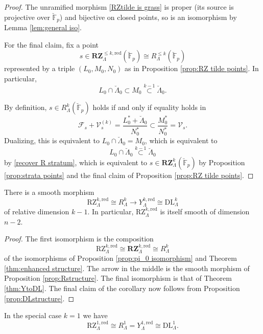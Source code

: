 \documentclass[11pt]{alggeom}
\newcommand{\iso}{\cong}
\newcommand{\red}{\mathrm{red}}
\newcommand{\F}{\mathbb F}
\begin{document}
\begin{proof}
The  unramified morphism \eqref{RZtilde is grass} is proper (its source  is projective over $\breve{\F}_p$) and bijective on closed points, so  is an isomorphism by Lemma \ref{lem:general iso}. 

For the final claim, fix a point 
\[
s\in \mathbf{RZ}_\Lambda^{\le k,\red}(\breve{\F}_p) \iso R_\Lambda^{\le k}(\breve{\F}_p)
\]
 represented by a triple $(L_0,M_0,N_0)$ as in Proposition \ref{prop:RZ tilde points}.  
 In particular,
 \begin{equation}\label{recover R stratum}
 L_0 \cap \breve{\Lambda}_0  \subset  M_0 \stackrel{k-1}{\subset} \breve{\Lambda}_0.
 \end{equation}
 
By definition,  $s \in R_\Lambda^k(\breve{\F}_p)$ holds if and only if equality holds in
\[
 \mathscr{F}_s + \mathscr{V}_s^{(k)} = \frac{L_0^*+ \breve{\Lambda}_0}{N_0^*} \subset \frac{M_0^*}{N_0^*} = \mathscr{V}_s.
\]
 Dualizing, this is equivalent to $L_0 \cap \breve{\Lambda}_0 = M_0$, which is equivalent to  
\[
L_0 \cap \breve{\Lambda}_0   \stackrel{k-1}{\subset} \breve{\Lambda}_0
\]
by \eqref{recover R stratum}, which is equivalent to  $s \in \mathbf{RZ}_\Lambda^k(\breve{\F}_p)$ by 
Proposition \ref{prop:strata points} and the final claim of Proposition \ref{prop:RZ tilde points}.
\end{proof}


\begin{corollary}\label{cor:grassmannian}
There is a  smooth morphism
\[
\mathrm{RZ}_\Lambda^{k,\red} \iso R^k_\Lambda  \to Y_\Lambda^{k,\red}\iso \mathrm{DL}_\Lambda^k
\]
of relative dimension $k-1$.  In particular, $\mathrm{RZ}_\Lambda^{k,\red}$ is itself smooth of dimension $n-2$.
\end{corollary}

\begin{proof}
The first isomorphism is the composition
\[
\mathrm{RZ}_\Lambda^{k,\red} \iso \mathbf{RZ}_\Lambda^{k,\red} \iso R^k_\Lambda
\]
of the isomorphisms of Proposition \ref{prop:pi_0 isomorphism} and Theorem \ref{thm:enhanced structure}.  The arrow in the middle is the smooth morphism of Proposition \ref{prop:Rstructure}.  The final isomorphism is that of Theorem \ref{thm:YtoDL}.  The final claim of the corollary now follows from Proposition \ref{prop:DLstructure}.
\end{proof}


\begin{remark}
In the special case $k=1$ we  have
\[
\mathrm{RZ}_\Lambda^{1,\red} \iso R^1_\Lambda = Y_\Lambda^{1,\mathrm{red}} \iso \mathrm{DL}_\Lambda^1 .
\]
\end{remark}
\end{document}
